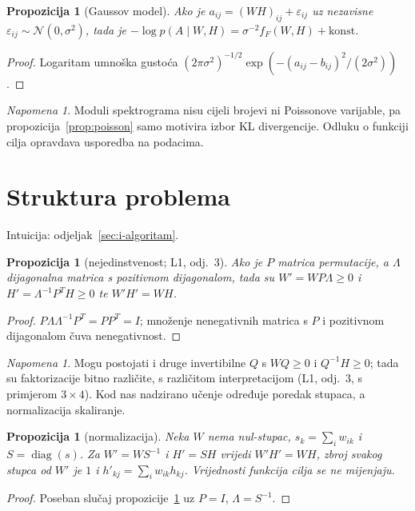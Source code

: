 \documentclass[11pt,a4paper]{article}
\theoremstyle{definition}
\theoremstyle{plain}
\newtheorem{propozicija}[definicija]{Propozicija}
\theoremstyle{remark}
\newtheorem{napomena}[definicija]{Napomena}
\DeclareMathOperator{\diag}{diag}
\newcommand{\intuicija}[1]{{\small\color{muted}\sffamily Intuicija: odjeljak~\ref{#1}.}\par}
\begin{document}
\begin{propozicija}[Gaussov model]
Ako je $a_{ij}=(WH)_{ij}+\varepsilon_{ij}$ uz nezavisne $\varepsilon_{ij}\sim\mathcal N(0,\sigma^2)$, tada
je $-\log p(A\mid W,H)=\sigma^{-2}f_F(W,H)+\text{konst}$.
\end{propozicija}
\begin{proof}
Logaritam umnoška gustoća $(2\pi\sigma^2)^{-1/2}\exp(-(a_{ij}-b_{ij})^2/(2\sigma^2))$.
\end{proof}

\begin{napomena}
Moduli spektrograma nisu cijeli brojevi ni Poissonove varijable, pa propozicija~\ref{prop:poisson}
samo motivira izbor KL divergencije. Odluku o funkciji cilja opravdava usporedba na podacima.
\end{napomena}

\section{Struktura problema}\label{sec:f-struktura}
\intuicija{sec:i-algoritam}

\begin{propozicija}[nejedinstvenost; L1, odj.~3]\label{prop:nejedinstvenost}
Ako je $P$ matrica permutacije, a $\Lambda$ dijagonalna matrica s pozitivnom dijagonalom, tada su
$W'=WP\Lambda\geq0$ i $H'=\Lambda^{-1}P^TH\geq0$ te $W'H'=WH$.
\end{propozicija}
\begin{proof}
$P\Lambda\Lambda^{-1}P^T=PP^T=I$; množenje nenegativnih matrica s $P$ i pozitivnom dijagonalom
čuva nenegativnost.
\end{proof}

\begin{napomena}
Mogu postojati i druge invertibilne $Q$ s $WQ\geq0$ i $Q^{-1}H\geq0$; tada su faktorizacije
bitno različite, s različitom interpretacijom (L1, odj.~3, s primjerom $3\times4$). Kod nas
nadzirano učenje određuje poredak stupaca, a normalizacija skaliranje.
\end{napomena}

\begin{propozicija}[normalizacija]\label{prop:normalizacija}
Neka $W$ nema nul-stupac, $s_k=\sum_iw_{ik}$ i $S=\diag(s)$. Za $W'=WS^{-1}$ i $H'=SH$ vrijedi
$W'H'=WH$, zbroj svakog stupca od $W'$ je $1$ i $h'_{kj}=\sum_i w_{ik}h_{kj}$. Vrijednosti funkcija
cilja se ne mijenjaju.
\end{propozicija}
\begin{proof}
Poseban slučaj propozicije~\ref{prop:nejedinstvenost} uz $P=I$, $\Lambda=S^{-1}$.
\end{proof}
\end{document}
